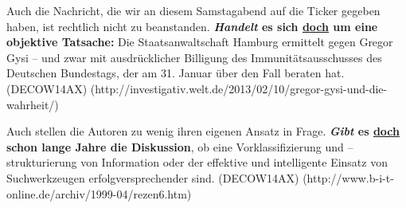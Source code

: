{\begin{exe}
	\ex\label{988} 
	\scriptsize
	Auch die Nachricht, die wir an diesem Samstagabend auf die Ticker gegeben haben, ist rechtlich nicht zu beanstanden. \textbf{\textit{Handelt} es sich 		\underline{doch} um eine objektive Tatsache:} Die Staatsanwaltschaft Hamburg ermittelt gegen Gregor Gysi – und zwar mit ausdrücklicher Billigung des 		Immunitätsausschusses des Deutschen Bundestags, der am 31. Januar über den Fall beraten hat. 
	\hfill\hbox {(DECOW14AX)}
	\newline
	\hbox{}\hfill\hbox{(http://investigativ.welt.de/2013/02/10/gregor-gysi-und-die-wahrheit/)}
\end{exe} 

\begin{exe}
	\ex\label{989} 
	\scriptsize
	Auch stellen die Autoren zu wenig ihren eigenen Ansatz in Frage. \textbf{\textit{Gibt} es \underline{doch} schon lange Jahre die Diskussion}, ob eine 		Vorklassifizierung und –strukturierung von Information oder der effektive und intelligente Einsatz von Suchwerkzeugen erfolgversprechender sind.
	\hfill\hbox {(DECOW14AX)}
	\newline
	\hbox{}\hfill\hbox{(http://www.b-i-t-online.de/archiv/1999-04/rezen6.htm)}
\end{exe} 							 

}
